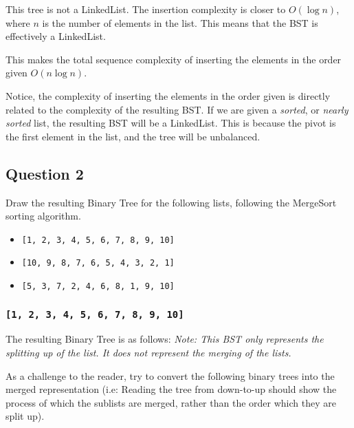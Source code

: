 \documentclass[12pt]{article}
\begin{document}
    This tree is not a LinkedList. The insertion complexity is closer to $O(\log n)$, where $n$ is the number of elements in the list. This means that the BST is effectively a LinkedList.

    This makes the total sequence complexity of inserting the elements in the order given $O(n \log n)$.

    Notice, the complexity of inserting the elements in the order given is directly related to the complexity of the resulting BST. If we are given a \textit{sorted}, or \textit{nearly sorted} list, the resulting BST will be a LinkedList. This is because the pivot is the first element in the list, and the tree will be unbalanced.

    \subsection{Question 2}
    Draw the resulting Binary Tree for the following lists, following the MergeSort sorting algorithm.
    \begin{itemize}
      \item \texttt{[1, 2, 3, 4, 5, 6, 7, 8, 9, 10]}
      \item \texttt{[10, 9, 8, 7, 6, 5, 4, 3, 2, 1]}
      \item \texttt{[5, 3, 7, 2, 4, 6, 8, 1, 9, 10]}
    \end{itemize}

    \subsubsection{\texttt{[1, 2, 3, 4, 5, 6, 7, 8, 9, 10]}}
    The resulting Binary Tree is as follows:
    \textit{Note: This BST only represents the splitting up of the list. It does not represent the merging of the lists.}

    As a challenge to the reader, try to convert the following binary trees into the merged representation (i.e: Reading the tree from down-to-up should show the process of which the sublists are merged, rather than the order which they are split up).
\end{document}
